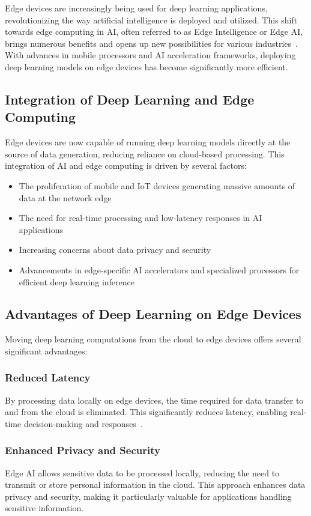\documentclass[9pt,a4paper,twoside]{rho-class/rho}
\begin{document}
Edge devices are increasingly being used for deep learning applications, revolutionizing the way artificial intelligence is deployed and utilized. This shift towards edge computing in AI, often referred to as Edge Intelligence or Edge AI, brings numerous benefits and opens up new possibilities for various industries~\cite{wang2020deep, qu2022enabling}. With advances in mobile processors and AI acceleration frameworks, deploying deep learning models on edge devices has become significantly more efficient.

\subsection{Integration of Deep Learning and Edge Computing}
Edge devices are now capable of running deep learning models directly at the source of data generation, reducing reliance on cloud-based processing. This integration of AI and edge computing is driven by several factors:
\begin{itemize}
    \item The proliferation of mobile and IoT devices generating massive amounts of data at the network edge
    \item The need for real-time processing and low-latency responses in AI applications
    \item Increasing concerns about data privacy and security~\cite{zewe2022learning}
    \item Advancements in edge-specific AI accelerators and specialized processors for efficient deep learning inference
\end{itemize}

\subsection{Advantages of Deep Learning on Edge Devices}
Moving deep learning computations from the cloud to edge devices offers several significant advantages:

\subsubsection{Reduced Latency}
By processing data locally on edge devices, the time required for data transfer to and from the cloud is eliminated. This significantly reduces latency, enabling real-time decision-making and responses~\cite{baller2021deep}.

\subsubsection{Enhanced Privacy and Security}
Edge AI allows sensitive data to be processed locally, reducing the need to transmit or store personal information in the cloud. This approach enhances data privacy and security, making it particularly valuable for applications handling sensitive information.
\end{document}
